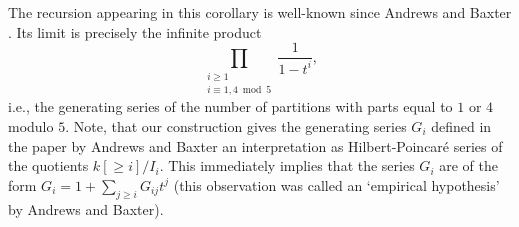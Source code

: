 The recursion appearing in this corollary is well-known since Andrews and Baxter \cite{andrews_baxter}. Its limit is
precisely the infinite product
\[ \prod_{\substack{i\geq 1\\ i\equiv 1, 4 \bmod 5}} \frac{1}{1-t^i}, \]
i.e., the generating series of the number of partitions with parts equal to $1$ or $4$ modulo $5$. Note, that our
construction gives the generating series $G_i$ defined in the paper by Andrews and Baxter an interpretation as
Hilbert-Poincar\'e series of the quotients $k[\geq i]/I_i$. This immediately implies that the series $G_i$ are of the
form $G_i = 1 + \sum_{j\geq i} G_{ij} t^j$ (this observation was called an `empirical hypothesis' by Andrews and Baxter).



